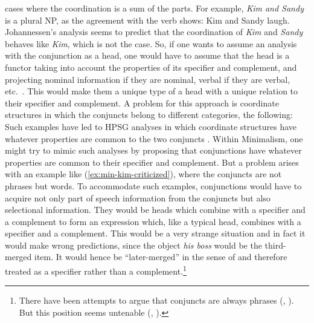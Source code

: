 \documentclass[output=paper,biblatex,babelshorthands,newtxmath,draftmode,colorlinks,citecolor=brown]{langscibook}
\begin{document}
cases where the coordination is a sum of the parts. For example, \emph{Kim and Sandy} is a plural
NP, as the agreement with the verb shows:
\ea
Kim and Sandy laugh.
\z
Johannessen's analysis seems to predict that the coordination of \emph{Kim} and \emph{Sandy} behaves
like \emph{Kim}, which is not the case. So, if one wants to assume an analysis with the conjunction
as a head, one would have to assume that the head is a functor taking into account the properties of
its specifier and complement, and projecting nominal information if they are nominal, verbal if they
are verbal, etc.\ \citep{Steedman91a}. This would make them a unique type of a head with a unique 
relation to their specifier and complement. A problem for this approach is coordinate structures in
which the conjuncts belong to different categories, \eg the following: 
\eal
{}\label{ex:min-hobbs-linguist}
\label{ex:min-hobbs-angry}
\zl 
Such examples have led to HPSG analyses in which coordinate structures have whatever properties are
common to the two conjuncts \citep{Sag2003a-u}. Within Minimalism, one might try to mimic such
analyses by proposing that conjunctions have whatever properties are common to their specifier and
complement. But a problem arises with an example like (\ref{ex:min-kim-criticized}), where the conjuncts are
not phrases but words.
\label{ex:min-kim-criticized}
\z
To accommodate such examples, conjunctions would have to acquire not only part of speech information
from the conjuncts but also selectional information. They would be heads which combine with a
specifier and a complement to form an expression which, like a typical head, combines with a
specifier and a complement. This would be a very strange situation and in fact it would make wrong
predictions, since the object \emph{his boss} would be the third-merged item. It would hence be
``later-merged'' in the sense of \citet[]{Chomsky2008a} and therefore treated as a specifier rather than a complement.\footnote{%
	There have been attempts to argue that conjuncts are always phrases (\citealt{Kayne94a-u}, \citealt{Bruening2018a}). But this position seems untenable (\citealt{Abeille2006a}, \citealt[Section~7]{MuellerLexicalism}).%
}
\end{document}
